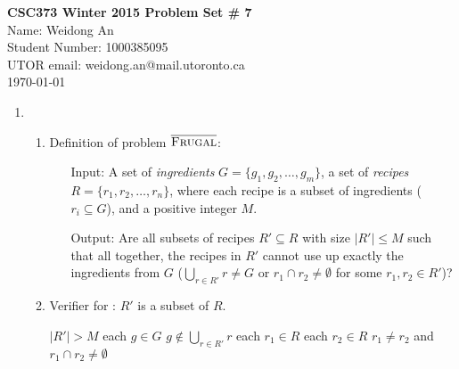 \documentclass[11pt]{article}
\begin{document}
\begin{center}
{\bf \Large \bf CSC373 Winter 2015 Problem Set \# 7}\\
Name: Weidong An\\
Student Number: 1000385095\\
UTOR email: weidong.an@mail.utoronto.ca\\
\today\\
\end{center}
\begin{enumerate}
\item
\begin{enumerate}
\item
Definition of problem $\overline{\textnormal{\scshape Frugal}}$:
\begin{enumerate}
    \item[Input:]
        A set of \emph{ingredients} $G = \{g_1,g_2,\dots,g_m\}$,
        a set of \emph{recipes} $R = \{r_1,r_2,\dots,r_n\}$,
        where each recipe is a subset of ingredients ($r_i \subseteq G$),
        and a positive integer $M$.
    \item[Output:]
        Are all subsets of recipes $R' \subseteq R$
        with size $|R'| \le M$ such that all together,
        the recipes in $R'$ cannot use up exactly the ingredients from $G$
        ($\bigcup_{r \in R'} r \neq G$ or
        $r_1 \cap r_2 \neq \emptyset$ for some $r_1,r_2 \in R'$)?
    \end{enumerate}
\item
Verifier for : $R'$ is a subset of $R$.
\begin{codebox}
\li \If $|R'| > M$
\li      \Then \Return {}\End
\li \For each $g\in G$
\li     \Then \If $g\notin \bigcup_{r \in R'} r$
\li             \Then \Return {} \End\End
\li \For each $r_1 \in R$
\li     \Then \For each $r_2\in R$
\li            \Then \If $r_1 \neq r_2$ and $r_1 \cap r_2 \neq \emptyset$
\li                    \Then \Return {}\End\End\End
\li \Return {}
\end{codebox}


\end{enumerate}
\end{enumerate}
\end{document}
